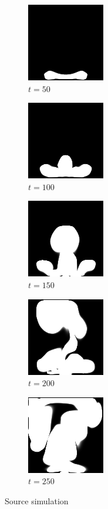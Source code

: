\documentclass[a4paper,12pt,twoside]{report}
\begin{document}
\begin{figure}
\centering
\begin{subfigure}{0.18\textwidth}
  \centering
  \includegraphics[scale=0.56]{buoyancy/dens_000050_src.png}
  \caption{$t=50$}
\end{subfigure}
\begin{subfigure}{0.18\textwidth}
  \centering
  \includegraphics[scale=0.56]{buoyancy/dens_000100_src.png}
  \caption{$t=100$}
\end{subfigure}
\begin{subfigure}{0.18\textwidth}
  \centering
  \includegraphics[scale=0.56]{buoyancy/dens_000150_src.png}
  \caption{$t=150$}
\end{subfigure}
\begin{subfigure}{0.18\textwidth}
  \centering
  \includegraphics[scale=0.56]{buoyancy/dens_000200_src.png}
  \caption{$t=200$}
\end{subfigure}
\begin{subfigure}{0.18\textwidth}
  \centering
  \includegraphics[scale=0.56]{buoyancy/dens_000249_src.png}
  \caption{$t=250$}
\end{subfigure}
\caption{Source simulation}
\end{figure}
\end{document}
